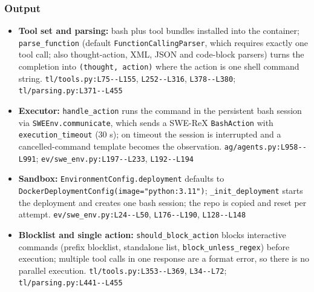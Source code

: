 \subsubsection*{Output}
\begin{itemize}
\item \textbf{Tool set and parsing:} bash plus tool bundles installed into the container; \texttt{parse\_\allowbreak{}function} (default \texttt{FunctionCallingParser}, which requires exactly one tool call; also thought-action, XML, JSON and code-block parsers) turns the completion into \texttt{(\allowbreak{}thought, action)} where the action is one shell command string. \texttt{tl/\allowbreak{}tools.\allowbreak{}py:\allowbreak{}L75-\allowbreak{}-\allowbreak{}L155}, \texttt{L252-\allowbreak{}-\allowbreak{}L316}, \texttt{L378-\allowbreak{}-\allowbreak{}L380}; \texttt{tl/\allowbreak{}parsing.\allowbreak{}py:\allowbreak{}L371-\allowbreak{}-\allowbreak{}L455}
\item \textbf{Executor:} \texttt{handle\_\allowbreak{}action} runs the command in the persistent bash session via \texttt{SWEEnv.\allowbreak{}communicate}, which sends a SWE-ReX \texttt{BashAction} with \texttt{execution\_\allowbreak{}timeout} (30 s); on timeout the session is interrupted and a cancelled-command template becomes the observation. \texttt{ag/\allowbreak{}agents.\allowbreak{}py:\allowbreak{}L958-\allowbreak{}-\allowbreak{}L991}; \texttt{ev/\allowbreak{}swe\_\allowbreak{}env.\allowbreak{}py:\allowbreak{}L197-\allowbreak{}-\allowbreak{}L233}, \texttt{L192-\allowbreak{}-\allowbreak{}L194}
\item \textbf{Sandbox:} \texttt{EnvironmentConfig.\allowbreak{}deployment} defaults to \texttt{DockerDeploymentConfig(\allowbreak{}image="python:\allowbreak{}3.\allowbreak{}11")}; \texttt{\_\allowbreak{}init\_\allowbreak{}deployment} starts the deployment and creates one bash session; the repo is copied and reset per attempt. \texttt{ev/\allowbreak{}swe\_\allowbreak{}env.\allowbreak{}py:\allowbreak{}L24-\allowbreak{}-\allowbreak{}L50}, \texttt{L176-\allowbreak{}-\allowbreak{}L190}, \texttt{L128-\allowbreak{}-\allowbreak{}L148}
\item \textbf{Blocklist and single action:} \texttt{should\_\allowbreak{}block\_\allowbreak{}action} blocks interactive commands (prefix blocklist, standalone list, \texttt{block\_\allowbreak{}unless\_\allowbreak{}regex}) before execution; multiple tool calls in one response are a format error, so there is no parallel execution. \texttt{tl/\allowbreak{}tools.\allowbreak{}py:\allowbreak{}L353-\allowbreak{}-\allowbreak{}L369}, \texttt{L34-\allowbreak{}-\allowbreak{}L72}; \texttt{tl/\allowbreak{}parsing.\allowbreak{}py:\allowbreak{}L441-\allowbreak{}-\allowbreak{}L455}

\end{itemize}
